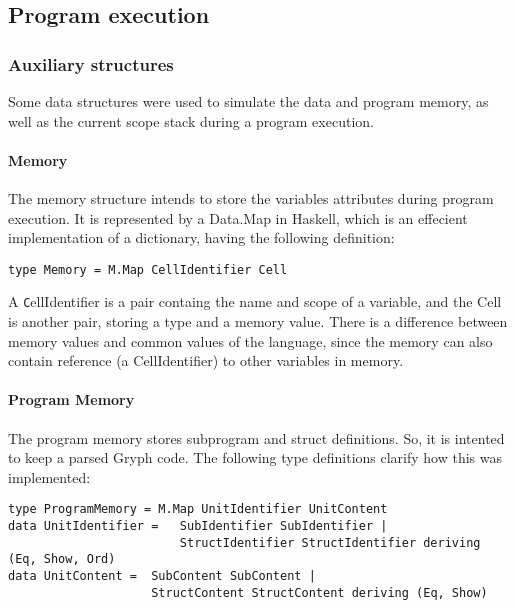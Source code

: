 \subsection{Program execution}

\subsubsection{Auxiliary structures}

Some data structures were used to simulate the data and
program memory, as well as the current scope stack
during a program execution. 

\paragraph{Memory}

The memory structure intends to store the variables
attributes during program execution. It is represented
by a Data.Map in Haskell, which is an effecient implementation
of a dictionary, having the following definition:

\begin{lstlisting}[language=Gryph, basicstyle=\footnotesize]
type Memory = M.Map CellIdentifier Cell
\end{lstlisting}

A {\texttt CellIdentifier} is a pair containg
the name and scope of a variable, and the Cell
is another pair, storing a type and a memory value.
There is a difference between memory values and
common values of the language, since
the memory can also contain reference (a CellIdentifier)
to other variables in memory.

\paragraph{Program Memory}

The program memory stores subprogram and struct definitions.
So, it is intented to keep a parsed Gryph code. The
following type definitions clarify how this was
implemented:

\begin{lstlisting}[language=Gryph, basicstyle=\footnotesize]
type ProgramMemory = M.Map UnitIdentifier UnitContent
data UnitIdentifier =   SubIdentifier SubIdentifier | 
                        StructIdentifier StructIdentifier deriving (Eq, Show, Ord)
data UnitContent =  SubContent SubContent | 
                    StructContent StructContent deriving (Eq, Show)
\end{lstlisting}


